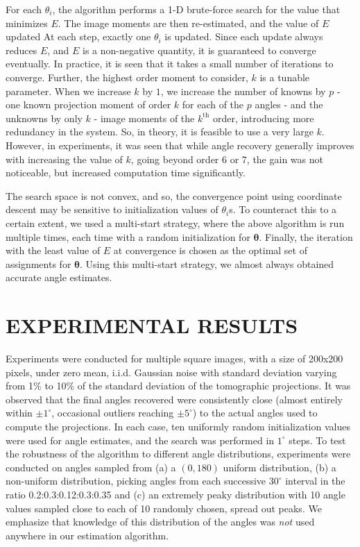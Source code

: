 \documentclass{article}
\begin{document}
For each $\theta_i$, the algorithm performs a 1-D brute-force search for the value that minimizes $E$. The image moments are then re-estimated, and the value of $E$ updated
At each step, exactly one $\theta_i$ is updated. Since each update always reduces $E$, and $E$ is a non-negative quantity, it is guaranteed to converge eventually. In practice, it is seen that it takes a small number of iterations to converge. Further, the highest order moment to consider, $k$ is a tunable parameter. When we increase $k$ by $1$, we increase the number of knowns by $p$ - one known projection moment of order $k$ for each of the $p$ angles - and the unknowns by only $k$ - image moments of the $k^\textrm{th}$ order, introducing more redundancy in the system. So, in theory, it is feasible to use a very large $k$. However, in experiments, it was seen that while angle recovery generally improves with increasing the value of $k$, going beyond order 6 or 7, the gain was not noticeable, but increased computation time significantly.

The search space is not convex, and so, the convergence point using coordinate descent may be sensitive to initialization values of $\theta_i$s. To counteract this to a certain extent, we used a multi-start strategy, where the above algorithm is run multiple times, each time with a random initialization for $\bm\theta$. Finally, the iteration with the least value of $E$ at convergence is chosen as the optimal set of assignments for $\bm{\theta}$. Using this multi-start strategy, we almost always obtained accurate angle estimates.

\section{EXPERIMENTAL RESULTS}
\label{sec:results}
Experiments were conducted for multiple square images, with a size of 200x200 pixels, under zero mean, i.i.d. Gaussian noise with standard deviation varying from 1\% to 10\% of the standard deviation of the tomographic projections. It was observed that the final angles recovered were consistently close (almost entirely within $\pm 1^{\circ}$, occasional outliers reaching $\pm 5^{\circ}$) to the actual angles used to compute the projections. In each case, ten uniformly random initialization values were used for angle estimates, and the search was performed in $1^{\circ}$ steps. To test the robustness of the algorithm to different angle distributions, experiments were conducted on angles sampled from (a) a $(0,180) $ uniform distribution, (b) a non-uniform distribution, picking angles from each successive $30^{\circ}$ interval in the ratio 0.2:0.3:0.12:0.3:0.35 and (c) an extremely peaky distribution with 10 angle values sampled close to each of 10 randomly chosen, spread out peaks. We emphasize that knowledge of this distribution of the angles was \emph{not} used anywhere in our estimation algorithm. 
\end{document}
